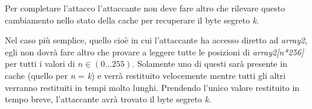 			Per completare l'attacco l'attaccante non deve fare altro che rilevare questo cambiamento nello stato della cache per recuperare il byte segreto \emph{k}.
			
			Nel caso più semplice, quello cioè in cui l'attaccante ha accesso diretto ad \emph{array2}, egli non dovrà fare altro che provare  a leggere tutte le posizioni di \emph{array2[n*256]} per tutti i valori di $n \in (0\dots255)$. Solamente uno di questi sarà presente in cache (quello per \emph{n} = \emph{k}) e verrà restituito velocemente mentre tutti gli altri verranno restituiti in tempi molto lunghi. Prendendo l'unico valore restituito in tempo breve, l'attaccante avrà trovato il byte segreto \emph{k}.
			